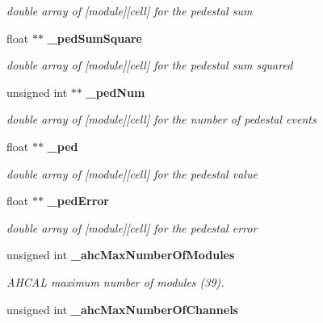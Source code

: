 \begin{DoxyCompactItemize}
\begin{DoxyCompactList}\small\item\em double array of [module][cell] for the pedestal sum \item\end{DoxyCompactList}\item 
float $\ast$$\ast$ {\bf \_\-pedSumSquare}\label{classCALICE_1_1PedestalProcessor_a9e0ddd7ae0bba557fd530741f6d386e5}

\begin{DoxyCompactList}\small\item\em double array of [module][cell] for the pedestal sum squared \item\end{DoxyCompactList}\item 
unsigned int $\ast$$\ast$ {\bf \_\-pedNum}\label{classCALICE_1_1PedestalProcessor_a9460997dc6fe25a8e362a93b20bc3ef9}

\begin{DoxyCompactList}\small\item\em double array of [module][cell] for the number of pedestal events \item\end{DoxyCompactList}\item 
float $\ast$$\ast$ {\bf \_\-ped}\label{classCALICE_1_1PedestalProcessor_a90da1932accfd689ab713b4cc576ee6d}

\begin{DoxyCompactList}\small\item\em double array of [module][cell] for the pedestal value \item\end{DoxyCompactList}\item 
float $\ast$$\ast$ {\bf \_\-pedError}\label{classCALICE_1_1PedestalProcessor_a127197da1199d8cecd356718609616e8}

\begin{DoxyCompactList}\small\item\em double array of [module][cell] for the pedestal error \item\end{DoxyCompactList}\item 
unsigned int {\bf \_\-ahcMaxNumberOfModules}\label{classCALICE_1_1PedestalProcessor_a476f3cc6d6a29482ec95e2fd3d84081e}

\begin{DoxyCompactList}\small\item\em AHCAL maximum number of modules (39). \item\end{DoxyCompactList}\item 
unsigned int {\bf \_\-ahcMaxNumberOfChannels}\label{classCALICE_1_1PedestalProcessor_a48806ad75d6e2d07b74b94983f3b0c8b}


\end{DoxyCompactItemize}
